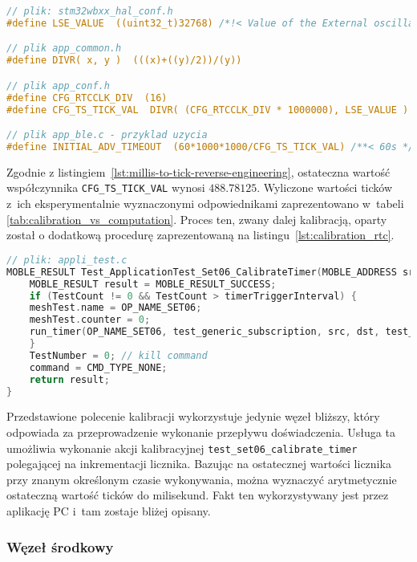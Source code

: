\begin{lstlisting}[language=C,
    caption={Ścieżka inżynierii wstecznej w celu znalezienia współczynnika umożliwiającego konwersję milisekund do ticków},
    label={lst:millis-to-tick-reverse-engineering}]
// plik: stm32wbxx_hal_conf.h
#define LSE_VALUE  ((uint32_t)32768) /*!< Value of the External oscillator in Hz*/

// plik app_common.h
#define DIVR( x, y )  (((x)+((y)/2))/(y))

// plik app_conf.h
#define CFG_RTCCLK_DIV  (16)
#define CFG_TS_TICK_VAL  DIVR( (CFG_RTCCLK_DIV * 1000000), LSE_VALUE )

// plik app_ble.c - przyklad uzycia
#define INITIAL_ADV_TIMEOUT  (60*1000*1000/CFG_TS_TICK_VAL) /**< 60s */
\end{lstlisting}

Zgodnie z listingiem~\ref{lst:millis-to-tick-reverse-engineering}, ostateczna wartość współczynnika \texttt{CFG\_TS\_TICK\_VAL}
wynosi $488.78125$. Wyliczone wartości ticków z~ich eksperymentalnie wyznaczonymi odpowiednikami zaprezentowano w~tabeli
\ref{tab:calibration_vs_computation}. Proces ten, zwany dalej kalibracją, oparty został o dodatkową procedurę zaprezentowaną
na listingu~\ref{lst:calibration_rtc}.

\begin{lstlisting}[language=C,
    caption={Kalibracja mikrokontrolera -- polecenie kalibracyjne},
    label={lst:calibration_rtc}]
// plik: appli_test.c
MOBLE_RESULT Test_ApplicationTest_Set06_CalibrateTimer(MOBLE_ADDRESS src ,MOBLE_ADDRESS dst) {
	MOBLE_RESULT result = MOBLE_RESULT_SUCCESS;
	if (TestCount != 0 && TestCount > timerTriggerInterval) {
	meshTest.name = OP_NAME_SET06;
	meshTest.counter = 0;
	run_timer(OP_NAME_SET06, test_generic_subscription, src, dst, test_set06_calibrate_timer);
	}
	TestNumber = 0; // kill command
	command = CMD_TYPE_NONE;
	return result;
}
\end{lstlisting}

Przedstawione polecenie kalibracji wykorzystuje jedynie węzeł bliższy, który odpowiada za przeprowadzenie
wykonanie przepływu doświadczenia. Usługa ta umożliwia wykonanie akcji kalibracyjnej \texttt{test\_set06\_calibrate\_timer}
polegającej na inkrementacji licznika. Bazując na ostatecznej wartości licznika przy znanym określonym czasie
wykonywania, można wyznaczyć arytmetycznie ostateczną wartość ticków do milisekund. Fakt ten wykorzystywany
jest przez aplikację PC i~tam zostaje bliżej opisany.

\subsubsection{Węzeł środkowy}

